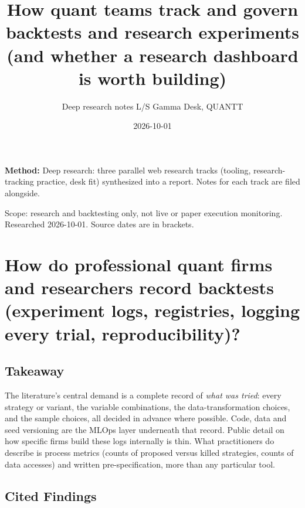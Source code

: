 \documentclass{article}
\title{How quant teams track and govern backtests and research experiments (and whether a research dashboard is worth building)}
\author{Deep research notes \textperiodcentered{} L/S Gamma Desk, QUANTT}
\date{2026-10-01}
\begin{document}
\maketitle

\textbf{Method:} Deep research: three parallel web research tracks (tooling, research-tracking practice, desk fit) synthesized into a report. Notes for each track are filed alongside.

Scope: research and backtesting only, not live or paper execution monitoring. Researched 2026-10-01. Source dates are in brackets.

\section{How do professional quant firms and researchers record backtests (experiment logs, registries, logging every trial, reproducibility)?}

\subsection{Takeaway}

The literature's central demand is a complete record of \emph{what was tried}: every strategy or variant, the variable combinations, the data-transformation choices, and the sample choices, all decided in advance where possible. Code, data and seed versioning are the MLOps layer underneath that record. Public detail on how specific firms build these logs internally is thin. What practitioners do describe is process metrics (counts of proposed versus killed strategies, counts of data accesses) and written pre-specification, more than any particular tool.

\subsection{Cited Findings}
\end{document}
